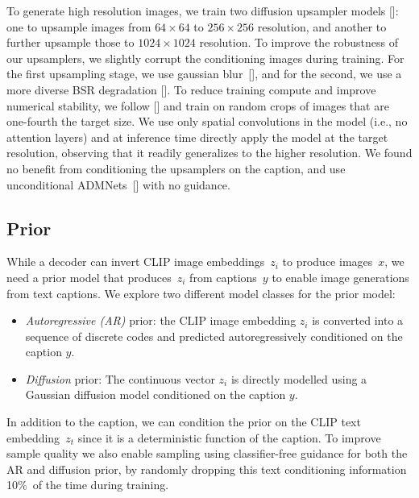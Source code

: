 To generate high resolution images, we train two diffusion upsampler models []: one to upsample images from $64 \times 64$ to $256 \times 256$ resolution, and another to further upsample those to $1024 \times 1024$ resolution. To improve the robustness of our upsamplers, we slightly corrupt the conditioning images during training. For the first upsampling stage, we use gaussian blur~[], and for the second, we use a more diverse BSR degradation []. To reduce training compute and improve numerical stability, we follow \citeauthor{latentdiffusion} [] and train on random crops of images that are one-fourth the target size. We use only spatial convolutions in the model (i.e., no attention layers) and at inference time directly apply the model at the target resolution, observing that it readily generalizes to the higher resolution. We found no benefit from conditioning the upsamplers on the caption, and use unconditional ADMNets~[] with no guidance. 

\subsection{Prior}
While a decoder can invert CLIP image embeddings~$z_i$ to produce images~$x$, we need a prior model that produces~$z_i$ from captions~$y$ to enable image generations from text captions. We explore two different model classes for the prior model:

\begin{itemize}
    \item \textit{Autoregressive (AR)} prior: the CLIP image embedding $z_i$ is converted into a sequence of discrete codes and predicted autoregressively conditioned on the caption $y$.
    \item \textit{Diffusion} prior: The continuous vector $z_i$ is directly modelled using a Gaussian diffusion model conditioned on the caption $y$.
\end{itemize}

In addition to the caption, we can condition the prior on the CLIP text embedding~$z_t$ since it is a deterministic function of the caption. To improve sample quality we also enable sampling using classifier-free guidance for both the AR and diffusion prior, by randomly dropping this text conditioning information 10\%~of the time during training.

